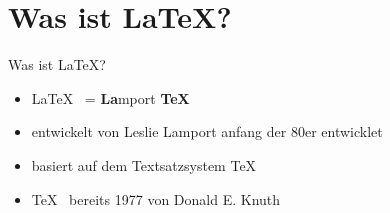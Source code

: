 
\section{Was ist \LaTeX ?}
%
\begin{frame}{Was ist \LaTeX ?}
	\begin{itemize}[<+->]
	\item \LaTeX \mbox{ } = \textbf{La}mport \textbf{TeX}
	\item entwickelt von Leslie Lamport anfang der 80er entwicklet
	\item basiert auf dem Textsatzsystem \TeX
	\item \TeX \mbox{ } bereits 1977 von Donald E. Knuth
	\end{itemize}
\end{frame}
